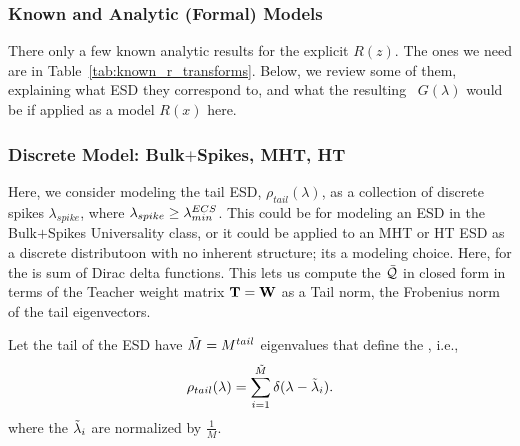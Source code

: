 


\subsubsection{Known \RTransforms and Analytic (Formal) Models}
\label{sxn:r_transforms:known_r_transforms}

There only a few known analytic results for the explicit \RTransform $R(z)$.
The ones we need are in Table~\ref{tab:known_r_transforms}.
Below, we review some of them, explaining what ESD they correspond to,
and what the resulting \GEN~$G(\lambda)$ would be if applied
as a model $R(x)$ here.



\subsubsection{Discrete Model: Bulk$+$Spikes, MHT, HT}

Here, we consider modeling the  tail ESD, $\rho_{tail}(\lambda)$, as a collection
of discrete spikes $\lambda_{spike}$, 
where $\lambda_{spike}\ge \lambda^{ECS}_{min}$.
This could be for modeling an ESD in the Bulk$+$Spikes \HTSR Universality class,
or it could be applied to an MHT or HT ESD as a discrete distributoon with
no inherent structure; its a modeling choice.
Here, \RTransform for the \ECS is sum of Dirac delta functions.
This lets us compute the \LayerQuality $\bar{\mathcal{Q}}$ in closed form in terms of the Teacher weight matrix
${\mathbf{T}}={\mathbf{W}}$ as a Tail norm, the Frobenius norm of the tail eigenvectors.

Let the tail of the ESD have $\tilde{M} = M^{tail}$ eigenvalues that define the \ECS, i.e.,  
\begin{equation}
\label{eqn:spikes_model_0}
\rho_{tail}(\lambda)=\sum_{i=1}^{\tilde{M}}\delta(\lambda-\tilde{\lambda}_{i}) .
\end{equation}
where the $\tilde{\lambda}_{i}$ are normalized by $\tfrac{1}{M}$.

